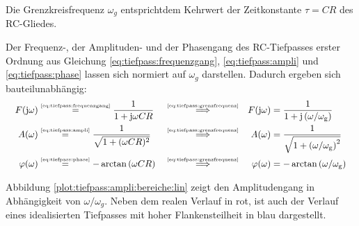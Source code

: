 \begin{frame}
{    Die Grenzkreisfrequenz $\omega_g$ entsprichtdem Kehrwert der Zeitkonstante $\tau = CR$ des RC-Gliedes.

    Der Frequenz-, der Amplituden- und der Phasengang des RC-Tiefpasses erster Ordnung aus Gleichung 
    \ref{eq:tiefpass:frequenzgang}, \ref{eq:tiefpass:ampli} und \ref{eq:tiefpass:phase}
    lassen sich normiert auf $\omega_g$ darstellen. Dadurch ergeben sich bauteilunabhängig:
    \begin{align}
        &&F(\mathrm{j}\omega) &\overset{\text{\tiny{\ref{eq:tiefpass:frequenzgang}}}}{=} \frac{1}{1+\mathrm{j}\omega CR} &  
            &\overset{\text{\tiny{\ref{eq:tiefpass:grenzfrequenz}}}}{\Longrightarrow}&
            F(\mathrm{j}\omega) &= \frac{1}{1+\mathrm{j}\left(\omega/\omega_{\mathrm{g}}\right)} &&\label{eq:tiefpass:normiert:frequenzgang}\\
        &&A(\omega) &\overset{\text{\tiny{\ref{eq:tiefpass:ampli}}}}{=} \frac{1}{\sqrt{1 + (\omega CR)^2 }} & 
            &\overset{\text{\tiny{\ref{eq:tiefpass:grenzfrequenz}}}}{\Longrightarrow}&
            A(\omega) &= \frac{1}{\sqrt{1 + \left(\omega/\omega_{\mathrm{g}}\right)^2 }} \label{eq:tiefpass:normiert:amplitudengang}\\
        &&\varphi(\omega) &\overset{\text{\tiny{\ref{eq:tiefpass:phase}}}}{=} -\arctan\left(\omega CR\right) &  
            &\overset{\text{\tiny{\ref{eq:tiefpass:grenzfrequenz}}}}{\Longrightarrow}&
            \varphi(\omega) &= -\arctan\left(\omega/\omega_{\mathrm{g}}\right) \label{eq:tiefpass:normiert:phasengang}
    \end{align}

    Abbildung \ref{plot:tiefpass:ampli:bereiche:lin} zeigt den Amplitudengang in Abhängigkeit von $\omega/\omega_g$.
    Neben dem realen Verlauf in rot, ist auch der Verlauf eines idealisierten Tiefpasses mit hoher Flankensteilheit in blau dargestellt.

}
\end{frame}
